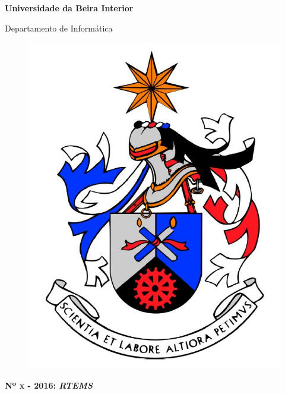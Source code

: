 
\thispagestyle{empty}
\setcounter{page}{-1}

\begin{center}
\begin{Huge}
\textbf{Universidade da Beira Interior}
\end{Huge}
\end{center}

\begin{center}
\begin{Huge}
Departamento de Informática
\end{Huge}
\end{center}

\vspace{0,07cm}
\begin{figure}[!htb]
\centering
\includegraphics[scale=0.3]{brasaoubi.JPG}
\end{figure}

\vspace{0.5cm}
\begin{center}
\begin{Large}
\textbf{Nº x - 2016: \emph{RTEMS}}
\end{Large}
\end{center}


